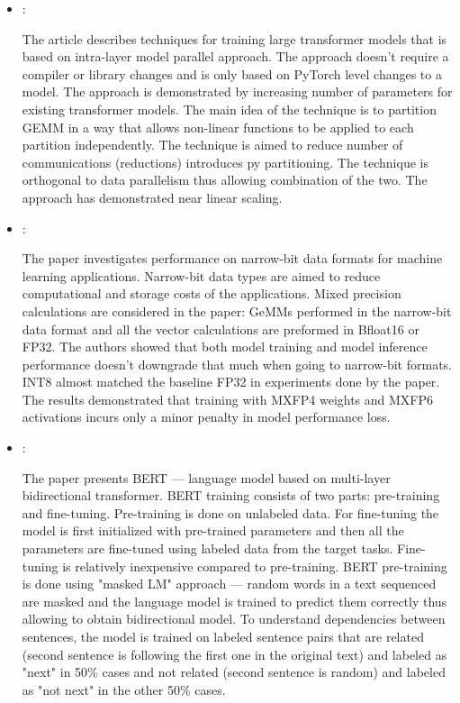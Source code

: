 \begin{itemize}
    \item \cite{Shoeybi:MegatronLM:2020}:

    The article describes techniques for training large transformer models that is based on intra-layer model parallel approach. The approach doesn't require a compiler or library changes and is only based on PyTorch level changes to a model. The approach is demonstrated by increasing number of parameters for existing transformer models. The main idea of the technique is to partition GEMM in a way that allows non-linear functions to be applied to each partition independently. The technique is aimed to reduce number of communications (reductions) introduces py partitioning. The technique is orthogonal to data parallelism thus allowing combination of the two. The approach has demonstrated near linear scaling.

    \item \cite{Rouhani:Microscaling:2023}:

    The paper investigates performance on narrow-bit data formats for machine learning applications. Narrow-bit data types are aimed to reduce computational and storage costs of the applications. Mixed precision calculations are considered in the paper: GeMMs performed in the narrow-bit data format and all the vector calculations are preformed in Bfloat16 or FP32. The authors showed that both model training and model inference performance doesn't downgrade that much when going to narrow-bit formats. INT8 almost matched the baseline FP32 in experiments done by the paper. The results demonstrated that training with MXFP4 weights and MXFP6 activations incurs only a minor penalty in model performance loss.

    \item \cite{Devlin:Bert:2019}:

    The paper presents BERT --- language model based on multi-layer bidirectional transformer. BERT training consists of two parts: pre-training and fine-tuning. Pre-training is done on unlabeled data. For fine-tuning the model is first initialized with pre-trained parameters and then all the parameters are fine-tuned using labeled data from the target tasks. Fine-tuning is relatively inexpensive compared to pre-training. BERT pre-training is done using "masked LM" approach --- random words in a text sequenced are masked and the language model is trained to predict them correctly thus allowing to obtain bidirectional model. To understand dependencies between sentences, the model is trained on labeled sentence pairs that are related (second sentence is following the first one in the original text) and labeled as "next" in 50\% cases and not related (second sentence is random) and labeled as "not next" in the other 50\% cases.


\end{itemize}
